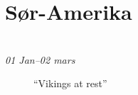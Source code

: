 
\chapter{Sør-Amerika}\\ {\footnotesize \textit{01 Jan--02 mars}}
\setcounter{page}{1}
\begin{figure}[!h]
      \centering
\noindent{}
\caption*{``Vikings at rest''}
\label{fig:colombia}
\end{figure}


